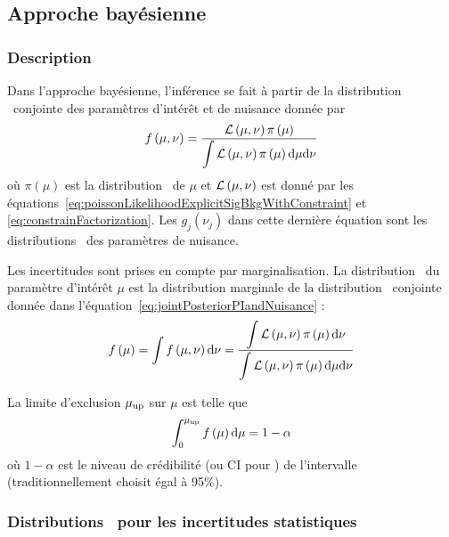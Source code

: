 \subsection{Approche bayésienne}
\label{sec:approcheBayesienne}

\subsubsection{Description}

Dans l'approche bay\'esienne, l'inf\'erence se fait \`a partir de la distribution \posterior~conjointe des param\`etres d'int\'er\^et et de nuisance donn\'ee par
\begin{equation}
\label{eq:jointPosteriorPIandNuisance}
f\left(\mu,\nu\right)=\frac{\Lh\left(\mu,\nu\right)\pi\left(\mu\right)}{\displaystyle\int\Lh\left(\mu,\nu\right)\pi\left(\mu\right)\dd\mu\dd\nu}
\end{equation}
o\`u $\pi\left(\mu\right)$ est la distribution \prior~de $\mu$ et ${\cal L}\left(\mu,\nu\right)$ est donn\'e par les \'equations~\ref{eq:poissonLikelihoodExplicitSigBkgWithConstraint} et \ref{eq:constrainFactorization}. Les $g_j(\nu_j)$ dans cette derni\`ere \'equation sont les distributions \prior~des param\`etres de nuisance. 

Les incertitudes sont prises en compte par marginalisation. La distribution \posterior~du param\`etre d'int\'er\^et $\mu$ est la distribution marginale de la distribution \posterior~conjointe donn\'ee dans l'\'equation~\ref{eq:jointPosteriorPIandNuisance} :
\begin{equation}
\label{eq:PIposterior}
f\left(\mu\right)=\displaystyle\int f\left(\mu,\nu\right)\dd\nu=\frac{\displaystyle\int\Lh\left(\mu,\nu\right)\pi\left(\mu\right)\dd\nu}{\displaystyle\int\Lh\left(\mu,\nu\right)\pi\left(\mu\right)\dd\mu\dd\nu}
\end{equation}

La limite d'exclusion $\mu_{\text{up}}$ sur $\mu$ est telle que
\begin{equation}
\displaystyle\int_{0}^{\mu_{\text{up}}} f\left(\mu\right){\rm d}\mu=1-\alpha
\end{equation}
o\`u $1-\alpha$ est le niveau de cr\'edibilit\'e (ou CI pour ) de l'intervalle (traditionnellement choisit \'egal \`a 95\%). 

\subsubsection{Distributions \prior~pour les incertitudes statistiques}
\label{sec:statUncertTreatmentBayesian}

